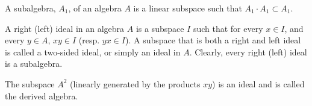 A subalgebra, $A_1$, of an algebra $A$ is a linear subspace such that $A_1 \cdot A_1 \subset A_1$.

A right (left) ideal in an algebra $A$ is a subspace $I$ such that for every $x \in I$, and every $y \in A$, $xy \in I$ (resp. $yx \in I$). A subspace that is both a right and left ideal is called a two-sided ideal, or simply an ideal in $A$. Clearly, every right (left) ideal is a subalgebra.

The subspace $A^2$ (linearly generated by the products $xy$) is an ideal and is called the derived algebra.
